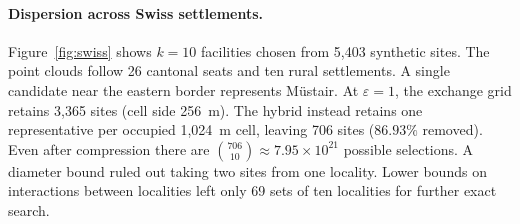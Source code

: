 \documentclass[a4paper,12pt]{article}
\numberwithin{equation}{section}
\begin{document}
\paragraph*{Dispersion across Swiss settlements.}
Figure~\ref{fig:swiss} shows $k=10$ facilities chosen from 5,403 synthetic sites.
The point clouds follow 26 cantonal seats and ten rural settlements. A single candidate near the
eastern border represents Müstair. At $\varepsilon=1$, the exchange
grid retains 3,365 sites (cell side 256~m). The hybrid instead retains one
representative per occupied 1,024~m cell, leaving 706 sites ($86.93\%$ removed).
Even after compression there are $\binom{706}{10}\approx7.95\times10^{21}$ possible selections. A diameter bound ruled
out taking two sites from one locality. Lower bounds on interactions between localities left only
69 sets of ten localities for further exact search.
\end{document}
